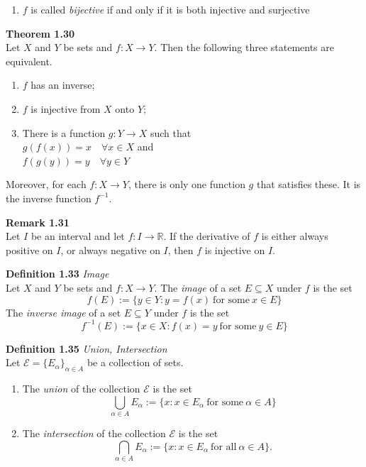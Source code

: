 \documentclass[8pt,landscape]{article}
\begin{document}
\begin{multicols}{3}
\begin{enumerate}
        \item $f$ is called \emph{bijective} if and only if it is both injective
            and surjective
    \end{enumerate}

    \textbf{Theorem 1.30} \\
    Let $X$ and $Y$ be sets and $f : X \to Y$.
    Then the following three statements are equivalent.
    \begin{enumerate}
        \item $f$ has an inverse;
        \item $f$ is injective from $X$ onto $Y$;
        \item There is a function $g : Y \to X$ such that \\
            $g(f(x)) = x \quad \forall x \in X$
            and \\
            $f(g(y)) = y \quad \forall y \in Y$
    \end{enumerate}
    Moreover, for each $f : X \to Y$, there is only one function $g$ that satisfies these.
    It is the inverse function $f^{-1}$.

    \textbf{Remark 1.31} \\
    Let $I$ be an interval and let $f : I \to \mathbb{R}$.
    If the derivative of $f$ is either always positive on $I$, or always negative on $I$,
    then $f$ is injective on $I$.

    \textbf{Definition 1.33} \emph{Image} \\
    Let $X$ and $Y$ be sets and $f : X \to Y$.
    The \emph{image} of a set $E \subseteq X$ under $f$ is the set
    \[
        f(E) := \{ y \in Y : y = f(x) \ \text{for some} \ x \in E \}
    \]
    The \emph{inverse image} of a set $E \subseteq Y$ under $f$ is the set
    \[
        f^{-1}(E) := \{ x \in X : f(x) = y \ \text{for some} \ y \in E \}
    \]

    \textbf{Definition 1.35} \emph{Union, Intersection} \\
    Let $\mathcal{E} = {\{ E_{\alpha} \}}_{\alpha \in A}$ be a collection of sets.
    \begin{enumerate}
        \item The \emph{union} of the collection $\mathcal{E}$ is the set
            \[
                \bigcup_{\alpha \in A} E_\alpha := \{ x : x \in E_\alpha \ \text{for some}
                \ \alpha \in A \}
            \]
        \item The \emph{intersection} of the collection $\mathcal{E}$ is the set
            \[
                \bigcap_{\alpha \in A} E_\alpha := \{ x : x \in E_\alpha \ \text{for all} \
                \alpha \in A \}.
            \]
    \end{enumerate}



\end{multicols}
\end{document}
